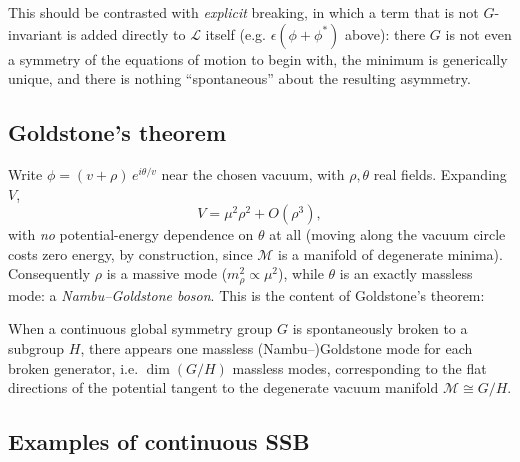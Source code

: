 This should be contrasted with \emph{explicit} breaking, in which a term that
is not $G$-invariant is added directly to $\mathcal{L}$ itself (e.g.
$\epsilon(\phi+\phi^*)$ above): there $G$ is not even a symmetry of the
equations of motion to begin with, the minimum is generically unique, and there
is nothing ``spontaneous'' about the resulting asymmetry.

\subsection{Goldstone's theorem}

Write $\phi = (v+\rho)\,e^{i\theta/v}$ near the chosen vacuum, with $\rho,\theta$ real fields. Expanding $V$,
\[
V = \mu^2\rho^2 + O(\rho^3), 
\]
with \emph{no} potential-energy dependence on $\theta$ at all (moving along the
vacuum circle costs zero energy, by construction, since $\mathcal M$ is a
manifold of degenerate minima). Consequently $\rho$ is a massive mode
($m_\rho^2\propto\mu^2$), while $\theta$ is an exactly massless mode: a
\emph{Nambu--Goldstone boson}. This is the content of Goldstone's theorem:

\begin{theorem}
When a continuous global symmetry group $G$ is spontaneously broken to a
    subgroup $H$, there appears one massless (Nambu--)Goldstone mode for each
    broken generator, i.e. $\dim(G/H)$ massless modes, corresponding to the
    flat directions of the potential tangent to the degenerate vacuum manifold
    $\mathcal M \cong G/H$.
\end{theorem}

\subsection{Examples of continuous SSB}

